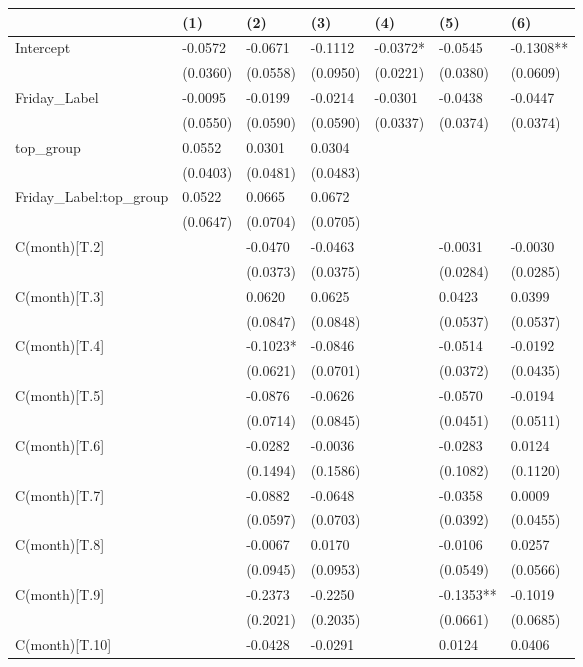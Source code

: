 \begin{tabular}{lllllll}
\toprule
 & (1) & (2) & (3) & (4) & (5) & (6) \\
\midrule
Intercept & -0.0572 & -0.0671 & -0.1112 & -0.0372* & -0.0545 & -0.1308** \\
 & (0.0360) & (0.0558) & (0.0950) & (0.0221) & (0.0380) & (0.0609) \\
Friday_Label & -0.0095 & -0.0199 & -0.0214 & -0.0301 & -0.0438 & -0.0447 \\
 & (0.0550) & (0.0590) & (0.0590) & (0.0337) & (0.0374) & (0.0374) \\
top_group & 0.0552 & 0.0301 & 0.0304 &  &  &  \\
 & (0.0403) & (0.0481) & (0.0483) &  &  &  \\
Friday_Label:top_group & 0.0522 & 0.0665 & 0.0672 &  &  &  \\
 & (0.0647) & (0.0704) & (0.0705) &  &  &  \\
C(month)[T.2] &  & -0.0470 & -0.0463 &  & -0.0031 & -0.0030 \\
 &  & (0.0373) & (0.0375) &  & (0.0284) & (0.0285) \\
C(month)[T.3] &  & 0.0620 & 0.0625 &  & 0.0423 & 0.0399 \\
 &  & (0.0847) & (0.0848) &  & (0.0537) & (0.0537) \\
C(month)[T.4] &  & -0.1023* & -0.0846 &  & -0.0514 & -0.0192 \\
 &  & (0.0621) & (0.0701) &  & (0.0372) & (0.0435) \\
C(month)[T.5] &  & -0.0876 & -0.0626 &  & -0.0570 & -0.0194 \\
 &  & (0.0714) & (0.0845) &  & (0.0451) & (0.0511) \\
C(month)[T.6] &  & -0.0282 & -0.0036 &  & -0.0283 & 0.0124 \\
 &  & (0.1494) & (0.1586) &  & (0.1082) & (0.1120) \\
C(month)[T.7] &  & -0.0882 & -0.0648 &  & -0.0358 & 0.0009 \\
 &  & (0.0597) & (0.0703) &  & (0.0392) & (0.0455) \\
C(month)[T.8] &  & -0.0067 & 0.0170 &  & -0.0106 & 0.0257 \\
 &  & (0.0945) & (0.0953) &  & (0.0549) & (0.0566) \\
C(month)[T.9] &  & -0.2373 & -0.2250 &  & -0.1353** & -0.1019 \\
 &  & (0.2021) & (0.2035) &  & (0.0661) & (0.0685) \\
C(month)[T.10] &  & -0.0428 & -0.0291 &  & 0.0124 & 0.0406 \\

\end{tabular}
